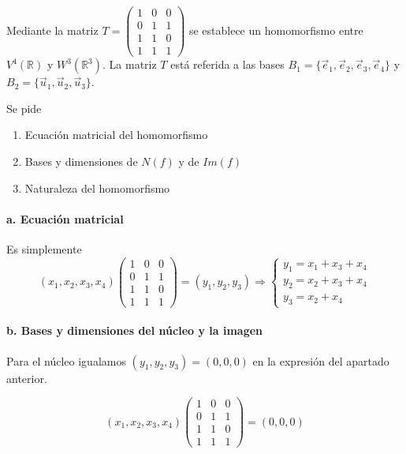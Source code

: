 \begin{problema}{\cite[12p349]{palacios}}{
	Mediante la matriz
	$T=\begin{pmatrix}
		1 & 0 & 0 \\
		0 & 1 & 1 \\
		1 & 1 & 0 \\
		1 & 1 & 1
	\end{pmatrix}$
	se establece un homomorfismo entre $V^4(\mathbb{R})$ y $W^3(\mathbb{R}^3)$. La matriz $T$ está
	referida a las bases $B_1=\{\vec{e}_1,\vec{e}_2,\vec{e}_3,\vec{e}_4\}$ y
	$B_2=\{\vec{u}_1,\vec{u}_2,\vec{u}_3\}$.

	Se pide

	\begin{enumerate}
		\item Ecuación matricial del homomorfismo
		\item Bases y dimensiones de $N(f)$ y de $Im(f)$
		\item Naturaleza del homomorfismo
	\end{enumerate}
	}
	\paragraph{a. Ecuación matricial} Es simplemente
	$$(x_1,x_2,x_3,x_4)
	\begin{pmatrix}
		1 & 0 & 0 \\
		0 & 1 & 1 \\
		1 & 1 & 0 \\
		1 & 1 & 1
	\end{pmatrix}
	=(y_1, y_2, y_3)
	\Rightarrow
	\begin{cases}
		y_1=x_1+x_3+x_4 \\
		y_2=x_2+x_3+x_4 \\
		y_3=x_2+x_4
	\end{cases}
	$$

	\paragraph{b. Bases y dimensiones del núcleo y la imagen} Para el núcleo igualamos $(y_1, y_2,
	y_3)=(0,0,0)$ en la expresión del apartado anterior. 

	$$(x_1,x_2,x_3,x_4)
	\begin{pmatrix}
		1 & 0 & 0 \\
		0 & 1 & 1 \\
		1 & 1 & 0 \\
		1 & 1 & 1
	\end{pmatrix}
	=(0,0,0)$$


\end{problema}
